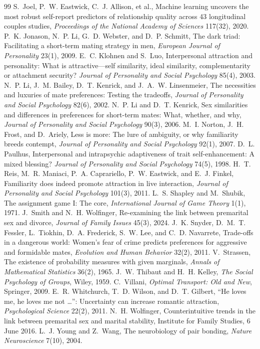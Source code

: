 \documentclass[11pt]{article}
\theoremstyle{definition}
\theoremstyle{remark}
\begin{document}
\begin{thebibliography}{99}
   S.~Joel, P.~W. Eastwick, C.~J. Allison, et al., Machine
  learning uncovers the most robust self-report predictors of
  relationship quality across 43 longitudinal couples studies,
  \emph{Proceedings of the National Academy of Sciences} 117(32), 2020.
   P.~K. Jonason, N.~P. Li, G.~D. Webster, and
  D.~P. Schmitt, The dark triad: Facilitating a short-term mating strategy
  in men, \emph{European Journal of Personality} 23(1), 2009.
   E.~C. Klohnen and S.~Luo, Interpersonal attraction and
  personality: What is attractive---self similarity, ideal similarity,
  complementarity or attachment security? \emph{Journal of Personality and
  Social Psychology} 85(4), 2003.
   N.~P. Li, J.~M. Bailey, D.~T. Kenrick, and
  J.~A.~W. Linsenmeier, The necessities and luxuries of mate preferences:
  Testing the tradeoffs, \emph{Journal of Personality and Social
  Psychology} 82(6), 2002.
   N.~P. Li and D.~T. Kenrick, Sex similarities and
  differences in preferences for short-term mates: What, whether, and
  why, \emph{Journal of Personality and Social Psychology} 90(3), 2006.
   M.~I. Norton, J.~H. Frost, and D.~Ariely, Less is more:
  The lure of ambiguity, or why familiarity breeds contempt,
  \emph{Journal of Personality and Social Psychology} 92(1), 2007.
   D.~L. Paulhus, Interpersonal and intrapsychic
  adaptiveness of trait self-enhancement: A mixed blessing? \emph{Journal
  of Personality and Social Psychology} 74(5), 1998.
   H.~T. Reis, M.~R. Maniaci, P.~A. Caprariello,
  P.~W. Eastwick, and E.~J. Finkel, Familiarity does indeed promote
  attraction in live interaction, \emph{Journal of Personality and Social
  Psychology} 101(3), 2011.
   L.~S. Shapley and M.~Shubik, The assignment game
  I: The core, \emph{International Journal of Game Theory} 1(1), 1971.
   J.~Smith and N.~H. Wolfinger, Re-examining the link
  between premarital sex and divorce, \emph{Journal of Family Issues}
  45(3), 2024.
   J.~K. Snyder, D.~M.~T. Fessler, L.~Tiokhin,
  D.~A. Frederick, S.~W. Lee, and C.~D. Navarrete, Trade-offs in a
  dangerous world: Women's fear of crime predicts preferences for
  aggressive and formidable mates, \emph{Evolution and Human Behavior}
  32(2), 2011.
   V.~Strassen, The existence of probability
  measures with given marginals, \emph{Annals of Mathematical
  Statistics} 36(2), 1965.
   J.~W. Thibaut and H.~H. Kelley, \emph{The Social
  Psychology of Groups}, Wiley, 1959.
   C.~Villani, \emph{Optimal Transport: Old and
  New}, Springer, 2009.
   E.~R. Whitchurch, T.~D. Wilson, and D.~T. Gilbert,
  ``He loves me, he loves me not \ldots'': Uncertainty can increase
  romantic attraction, \emph{Psychological Science} 22(2), 2011.
   N.~H. Wolfinger, Counterintuitive trends in the
  link between premarital sex and marital stability, Institute for
  Family Studies, 6 June 2016.
   L.~J. Young and Z.~Wang, The neurobiology of pair
  bonding, \emph{Nature Neuroscience} 7(10), 2004.
\end{thebibliography}
\end{document}

